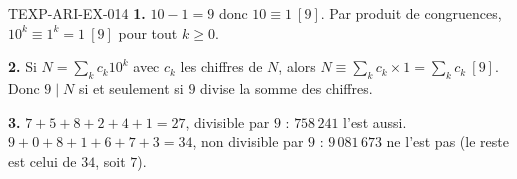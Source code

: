 \begin{corrige}{TEXP-ARI-EX-014}
\textbf{1.} $10-1=9$ donc $10\equiv1\ [9]$. Par produit de congruences,
$10^k\equiv1^k=1\ [9]$ pour tout $k\geq0$.

\textbf{2.} Si $N=\sum_k c_k10^k$ avec $c_k$ les chiffres de $N$, alors
$N\equiv\sum_k c_k\times1=\sum_k c_k\ [9]$. Donc $9\mid N$ si et seulement si
$9$ divise la somme des chiffres.

\textbf{3.} $7+5+8+2+4+1=27$, divisible par $9$ : $758\,241$ l'est aussi.
$9+0+8+1+6+7+3=34$, non divisible par $9$ : $9\,081\,673$ ne l'est pas
(le reste est celui de $34$, soit $7$).
\end{corrige}
